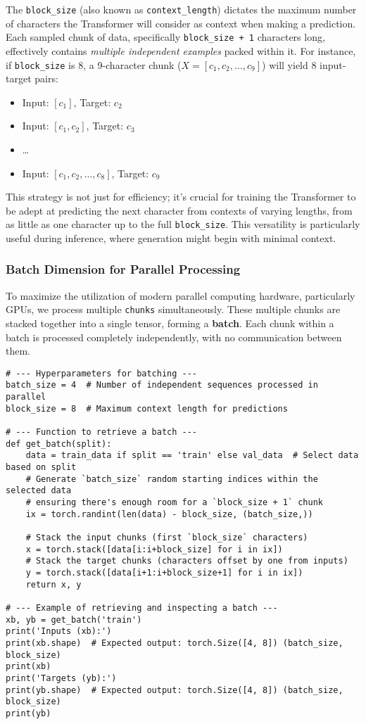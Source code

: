 The \texttt{block\_size} (also known as \texttt{context\_length}) dictates the maximum number of characters the Transformer will consider as context when making a prediction. Each sampled chunk of data, specifically \texttt{block\_size + 1} characters long, effectively contains \textit{multiple independent examples} packed within it. For instance, if \texttt{block\_size} is 8, a 9-character chunk ($X = [c_1, c_2, \ldots, c_9]$) will yield 8 input-target pairs:
\begin{itemize}
    \item Input: $[c_1]$, Target: $c_2$
    \item Input: $[c_1, c_2]$, Target: $c_3$
    \item \ldots
    \item Input: $[c_1, c_2, \ldots, c_8]$, Target: $c_9$
\end{itemize}
This strategy is not just for efficiency; it's crucial for training the Transformer to be adept at predicting the next character from contexts of varying lengths, from as little as one character up to the full \texttt{block\_size}. This versatility is particularly useful during inference, where generation might begin with minimal context.

\subsubsection{Batch Dimension for Parallel Processing}

To maximize the utilization of modern parallel computing hardware, particularly GPUs, we process multiple \texttt{chunks} simultaneously. These multiple chunks are stacked together into a single tensor, forming a \textbf{batch}. Each chunk within a batch is processed completely independently, with no communication between them.

\begin{lstlisting}[caption={Function to get a batch of data}]
# --- Hyperparameters for batching ---
batch_size = 4  # Number of independent sequences processed in parallel
block_size = 8  # Maximum context length for predictions

# --- Function to retrieve a batch ---
def get_batch(split):
    data = train_data if split == 'train' else val_data  # Select data based on split
    # Generate `batch_size` random starting indices within the selected data
    # ensuring there's enough room for a `block_size + 1` chunk
    ix = torch.randint(len(data) - block_size, (batch_size,))
    
    # Stack the input chunks (first `block_size` characters)
    x = torch.stack([data[i:i+block_size] for i in ix])
    # Stack the target chunks (characters offset by one from inputs)
    y = torch.stack([data[i+1:i+block_size+1] for i in ix])
    return x, y

# --- Example of retrieving and inspecting a batch ---
xb, yb = get_batch('train')
print('Inputs (xb):')
print(xb.shape)  # Expected output: torch.Size([4, 8]) (batch_size, block_size)
print(xb)
print('Targets (yb):')
print(yb.shape)  # Expected output: torch.Size([4, 8]) (batch_size, block_size)
print(yb)
\end{lstlisting}

